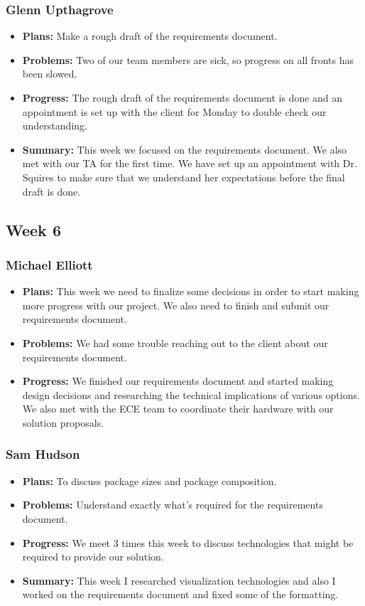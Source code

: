 \documentclass[onecolumn, draftclsnofoot,10pt, compsoc]{IEEEtran}
\begin{document}
\subsubsection{Glenn Upthagrove}
\begin {itemize}
 \item \textbf{Plans: }Make a rough draft of the requirements document.
 \item \textbf{Problems: }Two of our team members are sick, so progress on all fronts has been slowed.
 \item \textbf{Progress: }The rough draft of the requirements document is done and an appointment is set up with the client for Monday to double check our understanding. 
 \item \textbf{Summary: }This week we focused on the requirements document. We also met with our TA for the first time. We have set up an appointment with Dr. Squires to make sure that we understand her expectations before the final draft is done.  
\end {itemize}
\subsection {Week 6}
\subsubsection{Michael Elliott}
\begin {itemize}
\item \textbf{Plans: }
  This week we need to finalize some decisions in order to start making more progress with our project. We also need to finish and submit our requirements document.
\item \textbf{Problems: }
  We had some trouble reaching out to the client about our requirements document.
\item \textbf{Progress: }
  We finished our requirements document and started making design decisions and researching the technical implications of various options. We also met with the ECE team to coordinate their hardware with our solution proposals.
\end {itemize}
\subsubsection{Sam Hudson}
\begin {itemize}
\item \textbf{Plans: }To discuss package sizes and package composition.
\item \textbf{Problems: }Understand exactly what’s required for the requirements document.
\item \textbf{Progress: }We meet 3 times this week to discuss technologies that might be required to provide our solution.
\item \textbf{Summary: }This week I researched visualization technologies and also I worked on the requirements document and fixed some of the formatting.
\end {itemize}
\end{document}
